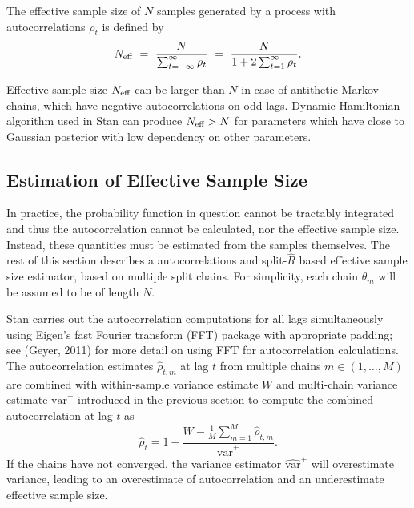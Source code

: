 \documentclass[11pt]{article}
\begin{document}
The effective sample size of $N$ samples generated by a process with
autocorrelations $\rho_t$ is defined by
\begin{equation}
N_{\mbox{\scriptsize eff}}
\ = \
\frac{N}{\sum_{t = -\infty}^{\infty} \rho_t}
\ = \
\frac{N}{1 + 2 \sum_{t = 1}^{\infty} \rho_t}.
\end{equation}

Effective sample size $N_{\mbox{\scriptsize eff}}$ can be larger than
$N$ in case of antithetic Markov chains, which have negative
autocorrelations on odd lags. Dynamic Hamiltonian algorithm used in Stan can
produce $N_{\mbox{\scriptsize eff}}>N$ for parameters which have close
to Gaussian posterior with low dependency on other parameters.

\subsection{Estimation of Effective Sample Size}

In practice, the probability function in question cannot be tractably
integrated and thus the autocorrelation cannot be calculated, nor the
effective sample size.  Instead, these quantities must be estimated
from the samples themselves.  The rest of this section describes a
autocorrelations and split-$\hat{R}$ based effective sample
size estimator, based on multiple split chains. For simplicity, each chain
$\theta_m$ will be assumed to be of length $N$.

Stan carries out the autocorrelation computations for all lags
simultaneously using Eigen's fast Fourier transform (FFT) package with
appropriate padding; see (Geyer, 2011) for more detail on using
FFT for autocorrelation calculations.
%
The autocorrelation estimates $\hat{\rho}_{t,m}$ at lag $t$ from
multiple chains $m \in (1,\ldots,M)$ are combined with within-sample variance estimate $W$ 
and multi-chain variance estimate
$\widehat{\mbox{var}}^{+}$ introduced in the previous section to compute the combined autocorrelation at lag $t$ as
\begin{equation}
\hat{\rho}_t
= 1 - \frac{\displaystyle W - \textstyle \frac{1}{M}\sum_{m=1}^M \hat{\rho}_{t,m}}{\widehat{\mbox{var}}^{+}}. \label{rhohat}
\end{equation}
If the chains have not converged, the variance estimator
$\widehat{\mbox{var}}^{+}$ will overestimate variance, leading to an
overestimate of autocorrelation and an underestimate effective sample
size.
\end{document}
